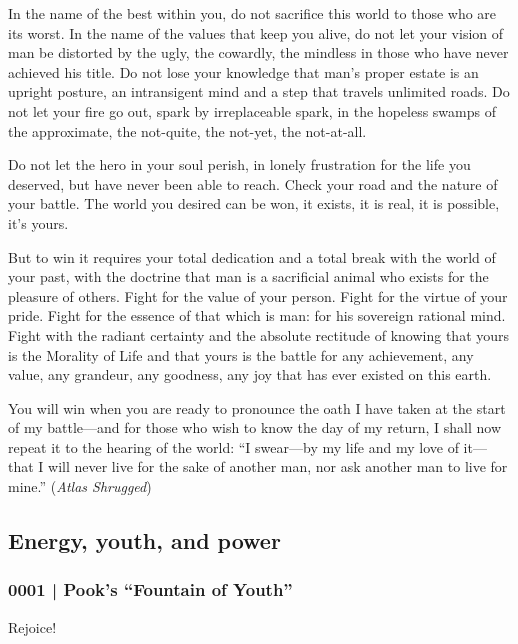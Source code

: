 			In the name of the best within you, do not sacrifice this world to those who are its worst. In the name of the values that keep you alive, do not let your vision of man be distorted by the ugly, the cowardly, the mindless in those who have never achieved his title. Do not lose your knowledge that man's proper estate is an upright posture, an intransigent mind and a step that travels unlimited roads. Do not let your fire go out, spark by irreplaceable spark, in the hopeless swamps of the approximate, the not-quite, the not-yet, the not-at-all.

			Do not let the hero in your soul perish, in lonely frustration for the life you deserved, but have never been able to reach. Check your road and the nature of your battle. The world you desired can be won, it exists, it is real, it is possible, it's yours.

			But to win it requires your total dedication and a total break with the world of your past, with the doctrine that man is a sacrificial animal who exists for the pleasure of others. Fight for the value of your person. Fight for the virtue of your pride. Fight for the essence of that which is man: for his sovereign rational mind. Fight with the radiant certainty and the absolute rectitude of knowing that yours is the Morality of Life and that yours is the battle for any achievement, any value, any grandeur, any goodness, any joy that has ever existed on this earth.

			You will win when you are ready to pronounce the oath I have taken at the start of my battle---and for those who wish to know the day of my return, I shall now repeat it to the hearing of the world: ``I swear---by my life and my love of it---that I will never live for the sake of another man, nor ask another man to live for mine.'' (\textit{Atlas Shrugged})
				
	\subsection{Energy, youth, and power} %
		\label{GM-LIFE-ENERGY}
		
		\subsubsection{0001 | Pook's ``Fountain of Youth''} %
			\label{GM-LIFE-ENERGY-0001}
			
			Rejoice!

